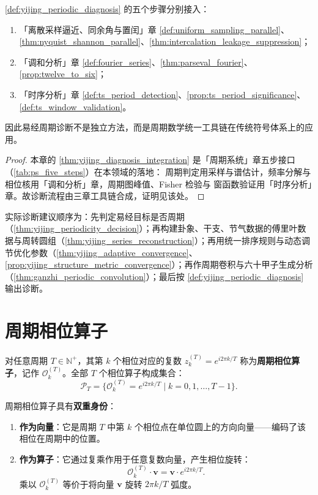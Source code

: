 \begin{theorem}[易经周期诊断流程与三章接口]\label{thm:yijing_diagnosis_integration}
\cref{def:yijing_periodic_diagnosis} 的五个步骤分别接入：
\begin{enumerate}[label=(\roman*)]
    \item 「离散采样逼近、同余角与置闰」章 \cref{def:uniform_sampling_parallel}、\cref{thm:nyquist_shannon_parallel}、\cref{thm:intercalation_leakage_suppression}；
    \item 「调和分析」章 \cref{def:fourier_series}、\cref{thm:parseval_fourier}、\cref{prop:twelve_to_six}；
    \item 「时序分析」章 \cref{def:ts_period_detection}、\cref{prop:ts_period_significance}、\cref{def:ts_window_validation}。
\end{enumerate}
因此易经周期诊断不是独立方法，而是周期数学统一工具链在传统符号体系上的应用。
\end{theorem}

\begin{proof}
本章的 \cref{thm:yijing_diagnosis_integration} 是「周期系统」章五步接口（\cref{tab:ps_five_steps}）在本领域的落地：
周期判定用采样与谱估计，频率分解与相位核用「调和分析」章，周期图峰值、Fisher 检验与
窗函数验证用「时序分析」章。故诊断流程由三章工具链合成，证明见该处。
\end{proof}

\begin{remark}[整合后的操作顺序]\label{rem:yijing_integration_order}
实际诊断建议顺序为：先判定易经目标是否周期（\cref{thm:yijing_periodicity_decision}）；再构建卦象、干支、节气数据的傅里叶数据与周转圆组（\cref{thm:yijing_series_reconstruction}）；再用统一排序规则与动态调节优化参数（\cref{thm:yijing_adaptive_convergence}、\cref{prop:yijing_structure_metric_convergence}）；再作周期卷积与六十甲子生成分析（\cref{thm:ganzhi_periodic_convolution}）；最后按 \cref{def:yijing_periodic_diagnosis} 输出诊断。
\end{remark}

\section{周期相位算子}

\begin{definition}[周期相位算子]\label{def:PPO_yijing}
对任意周期 $T \in \mathbb{N}^+$，其第 $k$ 个相位对应的复数 $z_k^{(T)} = e^{i2\pi k/T}$ 称为\textbf{周期相位算子}，记作 $\mathcal{O}_k^{(T)}$。全部 $T$ 个相位算子构成集合：
\[
\mathcal{P}_T = \{\mathcal{O}_k^{(T)} = e^{i2\pi k/T} \mid k = 0, 1, \dots, T-1\}.
\]

周期相位算子具有\textbf{双重身份}：
\begin{enumerate}[label=(\roman*)]
    \item \textbf{作为向量}：它是周期 $T$ 中第 $k$ 个相位点在单位圆上的方向向量——编码了该相位在周期中的位置。
    \item \textbf{作为算子}：它通过复乘作用于任意复数向量，产生相位旋转：
    \[
    \mathcal{O}_k^{(T)} \cdot \mathbf{v} = \mathbf{v} \cdot e^{i2\pi k/T}.
    \]
    乘以 $\mathcal{O}_k^{(T)}$ 等价于将向量 $\mathbf{v}$ 旋转 $2\pi k/T$ 弧度。
\end{enumerate}
\end{definition}

